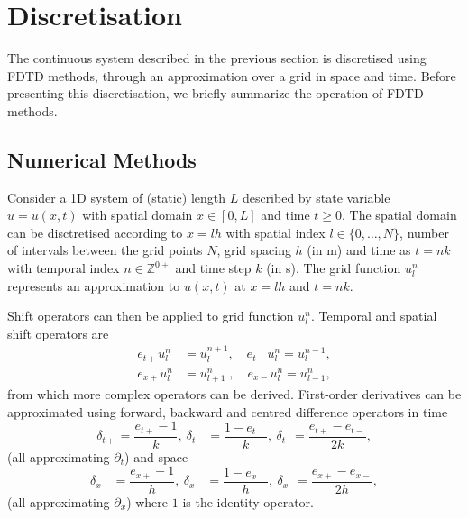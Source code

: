 

\section{Discretisation}\label{sec:discrete}
The continuous system described in the previous section is discretised using FDTD methods, through an approximation over a grid in space and time. Before presenting this discretisation, we briefly summarize the operation of FDTD methods.

\subsection{Numerical Methods}\label{sec:numMeth}
Consider a 1D system of (static) length $L$ described by state variable $u = u(x,t)$ with spatial domain $x\in [0, L]$ and time $t\geq 0$. The spatial domain can be disctretised according to $x=lh$ with spatial index $l \in \{0, \hdots, N\}$, number of intervals between the grid points $N$, grid spacing $h$ (in m) and time as $t=nk$ with temporal index $n \in \mathbb{Z}^{0+}$ and time step $k$ (in s). The grid function $u_l^n$ represents an approximation to $u(x,t)$ at $x=lh$ and $t=nk$. 

Shift operators can then be applied to grid function $u_l^n$. Temporal and spatial shift operators are
\begin{equation}
    \begin{aligned}
        e_{t+}u_l^n &= u_l^{n+1}, \quad e_{t-}u_l^n = u_l^{n-1},\\
        e_{x+}u_l^n &= u_{l+1}^n\;, \quad \!e_{x-}u_l^n = u_{l-1}^n,
    \end{aligned}
\end{equation}
from which more complex operators can be derived.
First-order derivatives can be approximated using forward, backward and centred difference operators in time
\begin{equation}\label{eq:discTimeOperators}
    \delta_{t+} = \frac{e_{t+} - 1}{k},\ \delta_{t-} = \frac{1 - e_{t-}}{k},\ \delta_{t\cdot} = \frac{e_{t+}-e_{t-}}{2k},
\end{equation}
(all approximating $\partial_t$) and space
\begin{equation}\label{eq:discSpaceOperators}
    \delta_{x+} = \frac{e_{x+} - 1}{h},\ \delta_{x-} = \frac{1 - e_{x-}}{h},\ \delta_{x\cdot} = \frac{e_{x+}-e_{x-}}{2h},
\end{equation} 
(all approximating $\partial_x$) where $1$ is the identity operator.

